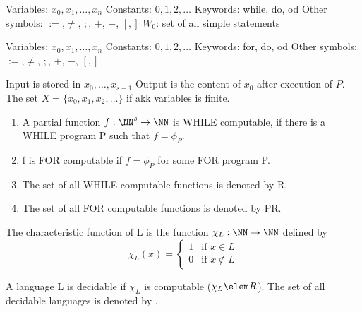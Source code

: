 
        Variables: $x_0, x_1, \ldots, x_n$\newline
        Constants: $0, 1, 2, \ldots$\newline
        Keywords: while, do, od\newline
        Other symbols: $:=$,$\neq$, $;$, $+$, $-$, $[,]$\newline
        $W_0$: set of all simple statements\newline

        Variables: $x_0, x_1, \ldots, x_n$\newline
        Constants: $0, 1, 2, \ldots$\newline
        Keywords: for, do, od\newline
        Other symbols: $:=$,$\neq$, $;$, $+$, $-$, $[,]$\newline
    
        Input is stored in $x_0, \ldots, x_{s-1}$
        Output is the content of $x_0$ after execution of $P$.\newline
        The set $X = \{ x_0, x_1, x_2, \ldots \}$ if akk variables is finite.\newline

        \begin{enumerate}
            \item A partial function $f: \NN^s \rightarrow \NN$ is WHILE computable, if there is
            a WHILE program P such that $f = \phi_P$.
            \item f is FOR computable if $f = \phi_P$ for some FOR program P.
            \item The set of all WHILE computable functions is denoted by R.
            \item The set of all FOR computable functions is denoted by PR.
        \end{enumerate}

        The characteristic function of L is the function $\chi_L: \NN \rightarrow \NN$ defined by
        \begin{equation*}
            \chi_L(x) = \begin{cases}
                1 & \text{if } x \in L \\
                0 & \text{if } x \notin L
            \end{cases}
        \end{equation*}

        A language L is decidable if $\chi_L$ is computable ($\chi_L \elem R$).\newline
        The set of all decidable languages is denoted by \REC.\newline